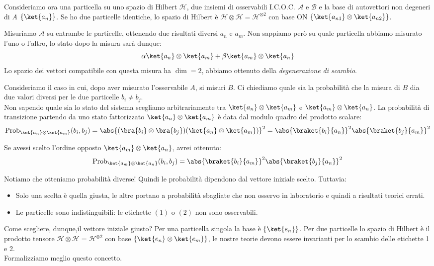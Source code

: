 

Consideriamo ora una particella su uno spazio di Hilbert \(\mathcal{H}\), due insiemi di osservabili I.C.O.C. \(\mathcal{A}\) e \(\mathcal{B}\) e la base di autovettori non degeneri di \(A\) \(\left\{ \ket{a_n} \right\}\).
Se ho due particelle identiche, lo spazio di Hilbert è \(\mathcal{H}\otimes\mathcal{H}= \mathcal{H}^{\otimes2}\) con base ON \(\left\{ \ket{a_{n1}}\otimes \ket{a_{n2}} \right\}\).

Misuriamo \(\mathcal{A}\) su entrambe le particelle, ottenendo due risultati diversi \(a_n\) e \(a_m\). Non sappiamo però su quale particella abbiamo misurato l'uno o l'altro, lo stato dopo la misura sarà dunque:
\[
    \alpha\ket{a_n}\otimes\ket{a_m} + \beta \ket{a_m}\otimes\ket{a_n}
\]
Lo spazio dei vettori compatibile con questa misura ha \(\dim =2\), abbiamo ottenuto della \textit{degenerazione di scambio}.



Consideriamo il caso in cui, dopo aver misurato l'osservabile \( A \), si misuri \( B \). Ci chiediamo quale sia la probabilità che la misura di \( B \) dia due valori diversi per le due particelle \( b_i \neq b_j \).\\
Non sapendo quale sia lo stato del sistema scegliamo arbitrariamente tra \(\ket{a_n}\otimes\ket{a_m} \) e \( \ket{a_m}\otimes\ket{a_n}\).
La probabilità di transizione partendo da uno stato fattorizzato \( \ket{a_n}\otimes\ket{a_m} \) è data dal modulo quadro del prodotto scalare:
\[
    \text{Prob}_{\ket{a_n}\otimes\ket{a_m}}(b_i, b_j) = \abs{(\bra{b_i}\otimes\bra{b_j})(\ket{a_n}\otimes\ket{a_m})}^2
    = \abs{\braket{b_i}{a_n}}^2 \abs{\braket{b_j}{a_m}}^2
\]

Se avessi scelto l'ordine opposto \( \ket{a_m}\otimes\ket{a_n} \), avrei ottenuto:
\[
    \text{Prob}_{\ket{a_m}\otimes\ket{a_n}}(b_i, b_j) = \abs{\braket{b_i}{a_m}}^2 \abs{\braket{b_j}{a_n}}^2
\]

Notiamo che otteniamo probabilità diverse! Quindi le probabilità dipendono dal vettore iniziale scelto. Tuttavia:
\begin{itemize}
    \item Solo una scelta è quella giusta, le altre portano a probabilità sbagliate che non osservo in laboratorio e quindi a risultati teorici errati.
    \item Le particelle sono indistinguibili: le etichette \( (1) \) o \( (2) \) non sono osservabili.
\end{itemize}
Come scegliere, dunque,il vettore iniziale giusto?
Per una particella singola la base è \( \{ \ket{e_n} \} \). Per due particelle lo spazio di Hilbert è il prodotto tensore \( \mathcal{H} \otimes \mathcal{H} = \mathcal{H}^{\otimes 2} \) 
con base \( \{ \ket{e_n}\otimes\ket{e_m} \} \), le nostre teorie devono essere invarianti per lo scambio delle etichette 1 e 2.\\
Formalizziamo meglio questo concetto.

